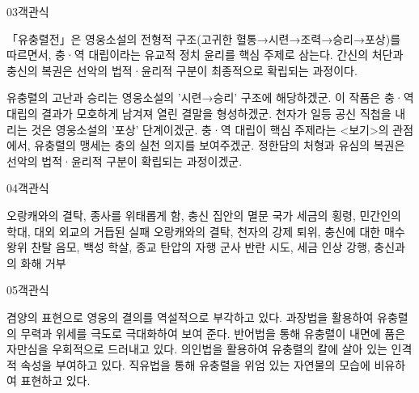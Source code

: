 \documentclass[fs85,seriesWit]{korfarm-base}
\begin{document}
\begin{kfQBlock}{03}{객관식}
\begin{kfEvidence}「유충렬전」은 영웅소설의 전형적 구조(고귀한 혈통→시련→조력→승리→포상)를 따르면서, 충·역 대립이라는 유교적 정치 윤리를 핵심 주제로 삼는다. 간신의 처단과 충신의 복권은 선악의 법적·윤리적 구분이 최종적으로 확립되는 과정이다.\end{kfEvidence}
\begin{kfChoices}
\kfChoice 유충렬의 고난과 승리는 영웅소설의 '시련→승리' 구조에 해당하겠군.
\kfChoice 이 작품은 충·역 대립의 결과가 모호하게 남겨져 열린 결말을 형성하겠군.
\kfChoice 천자가 일등 공신 직첩을 내리는 것은 영웅소설의 '포상' 단계이겠군.
\kfChoice 충·역 대립이 핵심 주제라는 <보기>의 관점에서, 유충렬의 맹세는 충의 실천 의지를 보여주겠군.
\kfChoice 정한담의 처형과 유심의 복권은 선악의 법적·윤리적 구분이 확립되는 과정이겠군.
\end{kfChoices}
\end{kfQBlock}

\begin{kfQBlock}{04}{객관식}
\begin{kfChoices}
\kfChoice 오랑캐와의 결탁, 종사를 위태롭게 함, 충신 집안의 멸문
\kfChoice 국가 세금의 횡령, 민간인의 학대, 대외 외교의 거듭된 실패
\kfChoice 오랑캐와의 결탁, 천자의 강제 퇴위, 충신에 대한 매수
\kfChoice 왕위 찬탈 음모, 백성 학살, 종교 탄압의 자행
\kfChoice 군사 반란 시도, 세금 인상 강행, 충신과의 화해 거부
\end{kfChoices}
\end{kfQBlock}

\begin{kfQBlock}{05}{객관식}
\begin{kfChoices}
\kfChoice 겸양의 표현으로 영웅의 결의를 역설적으로 부각하고 있다.
\kfChoice 과장법을 활용하여 유충렬의 무력과 위세를 극도로 극대화하여 보여 준다.
\kfChoice 반어법을 통해 유충렬이 내면에 품은 자만심을 우회적으로 드러내고 있다.
\kfChoice 의인법을 활용하여 유충렬의 칼에 살아 있는 인격적 속성을 부여하고 있다.
\kfChoice 직유법을 통해 유충렬을 위엄 있는 자연물의 모습에 비유하여 표현하고 있다.
\end{kfChoices}
\end{kfQBlock}

\kfEndMC
\end{document}
